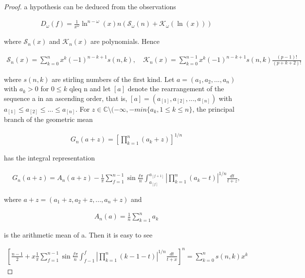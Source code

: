 \begin{proof}
      a hypothesis can be deduced from the observations
      
      \begin{align}
            D_\omega(f) = \frac{1}{x^\omega}\ln^{n-\omega}(x)n( 
            \mathcal{S}_\omega(n) + \mathcal{K}_\omega(\ln(x)))
      \end{align}
      
      where \(\mathcal{S}_n(x)\) and \(\mathcal{K}_n(x)\) are polynomials. Hence
      
      \begin{align}
            \mathcal{S}_n(x) = \sum_{k=0}^n x^k (-1)^{n-k+1}s(n, 
            k), \ & \mathcal{K}_n(x) = \sum_{k=0}^{n-1}x^k 
            (-1)^{n-k+1}s(n, k) \frac{(p-1)!}{(p+k+2)!}
      \end{align}
      
      where \(s(n, k)\) are stirling numbers of the first kind. Let \(a =
      (a_1, a_2, ..., a_n)\) with \(a_k > 0\) for \(0 \leq k\) qleq n and 
      let \([a]\) denote the rearrangement of the sequence a in an ascending 
      order, that is, \([a]=(a_{[1]}, a_{[2]}, ..., a_{[n]})\) with \(a_{[1]}
      \leq a_{[2]} \leq  ... \leq a_{[n]}\). For \(z \in \mathbb{C} \setminus
      (-\infty, -min\{a_k, 1 \leq k \leq n\}\), the principal branch of the geometric mean
      
      \begin{align}
            G_n(a+z) = \left[ \prod_{k=1}^{n} (a_k +z)\right]^{1/n}
      \end{align}
      
      has the integral representation 
      
      \begin{align}
            G_n(a+z) = A_n(a+z) - \frac{1}{\pi} \sum_{f=1}^{n-1}\sin
            \frac{f\pi}{n}\int_{a_{[f]}}^{a_{[f+1]}}\left|\prod_{k=1}^{n}
            (a_k -t) \right|^{1/n}\frac{dt}{t+z},
      \end{align}
      
      where \(a+z=(a_1 + z, a_2+z, ..., a_n+z)\) and
      
      \begin{align}
            A_n(a) = \frac{1}{n}\sum_{k=1}^{n}a_k
      \end{align}
      
      is the arithmetic mean of a. Then it is easy to see
      
      \begin{align}
      \left[ \frac{n-1}{2} +x \frac{1}{\pi} \sum_{f=1}^{n-1} 
      \sin\frac{f\pi}{n} \int_{f-1}^{f} \left|\prod_{k=1}^{n} 
      (k-1 -t) \right|^{1/n}\frac{dt}{t+x}\right]^n = 
      \sum_{k=0}^{n}s(n, k) x^k
      

\end{align}
\end{proof}
